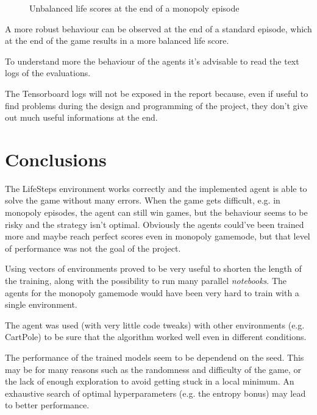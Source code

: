 \documentclass{article}
\begin{document}
\begin{figure}
  \centering
  \caption{Unbalanced life scores at the end of a monopoly episode}
  \label{fig:F}
\end{figure}

A more robust behaviour can be observed at the end of a standard episode, which at the end of the game results in a more balanced life score. 

To understand more the behaviour of the agents it's advisable to read the text logs of the evaluations.

The Tensorboard logs will not be exposed in the report because, even if useful to find problems during the design and programming of the project, they don't give out much useful informations at the end.

\section{Conclusions}

The LifeSteps environment works correctly and the implemented agent is able to solve the game without many errors. When the game gets difficult, e.g. in monopoly episodes, the agent can still win games, but the behaviour seems to be risky and the strategy isn't optimal. Obviously the agents could've been trained more and maybe reach perfect scores even in monopoly gamemode, but that level of performance was not the goal of the project. 

Using vectors of environments proved to be very useful to shorten the length of the training, along with the possibility to run many parallel \textit{notebooks}. The agents for the monopoly gamemode would have been very hard to train with a single environment. 

The agent was used (with very little code tweaks) with other environments (e.g. CartPole) to be sure that the algorithm worked well even in different conditions. 

The performance of the trained models seem to be dependend on the seed. This may be for many reasons such as the randomness and difficulty of the game, or the lack of enough exploration to avoid getting stuck in a local minimum. An exhaustive search of optimal hyperparameters (e.g. the entropy bonus) may lead to better performance.
\end{document}
